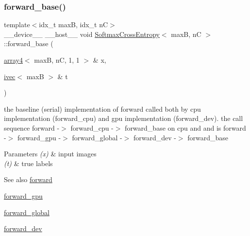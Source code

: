 \subsubsection{\texorpdfstring{forward\+\_\+base()}{forward\_base()}}
{\footnotesize\ttfamily template$<$idx\+\_\+t maxB, idx\+\_\+t nC$>$ \\
\+\_\+\+\_\+device\+\_\+\+\_\+ \+\_\+\+\_\+host\+\_\+\+\_\+ void \hyperlink{structSoftmaxCrossEntropy}{Softmax\+Cross\+Entropy}$<$ maxB, nC $>$\+::forward\+\_\+base (\begin{DoxyParamCaption}\item[{\hyperlink{structarray4}{array4}$<$ maxB, nC, 1, 1 $>$ \&}]{x,  }\item[{\hyperlink{structivec}{ivec}$<$ maxB $>$ \&}]{t }\end{DoxyParamCaption})\hspace{0.3cm}{\ttfamily [inline]}}



the baseline (serial) implementation of forward called both by cpu implementation (forward\+\_\+cpu) and gpu implementation (forward\+\_\+dev). the call sequence forward -\/$>$ forward\+\_\+cpu -\/$>$ forward\+\_\+base on cpu and and is forward -\/$>$ forward\+\_\+gpu -\/$>$ forward\+\_\+global -\/$>$ forward\+\_\+dev -\/$>$ forward\+\_\+base 


\begin{DoxyParams}{Parameters}
{\em (x)} & input images \\
\hline
{\em (t)} & true labels \\
\hline
\end{DoxyParams}
\begin{DoxySeeAlso}{See also}
\hyperlink{structSoftmaxCrossEntropy_ad9123a2a40bac45237466faf0cff3fbc}{forward} 

\hyperlink{structSoftmaxCrossEntropy_a0e71f6ceb53d769e6b4d7a6d83034669}{forward\+\_\+gpu} 

\hyperlink{softmaxcrossentropy_8h_a578aeeb166bd06e800d9b396eab48b35}{forward\+\_\+global} 

\hyperlink{structSoftmaxCrossEntropy_ac64934c6de42a065529dceafa38c157a}{forward\+\_\+dev} 
\end{DoxySeeAlso}
\mbox{\label{structSoftmaxCrossEntropy_a3e4f2e0a025eaf98fa9f614dd355bdf7}} 

